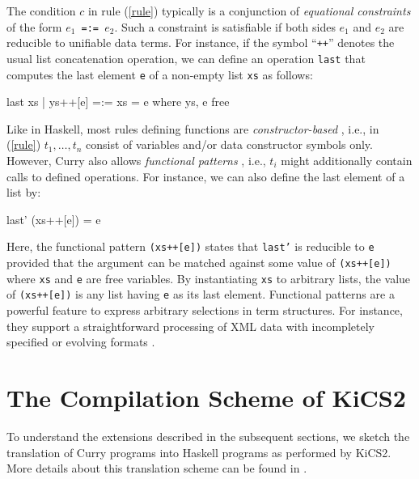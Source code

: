 \documentclass{llncs}
\newcommand{\code}[1]{\mbox{\small\texttt{#1}}}
\begin{document}
The condition $c$ in rule (\ref{rule}) typically is a
conjunction of \emph{equational constraints}
of the form \code{$e_1$\,=:=\,$e_2$}.
Such a constraint is satisfiable if
both sides $e_1$ and $e_2$ are reducible to unifiable data terms.
For instance, if the symbol ``\code{++}'' denotes the usual list
concatenation operation, we can define an operation \code{last}
that computes the last element \code{e} of a non-empty list \code{xs}
as follows:
%
\label{ex:last}
\begin{curry}
  last xs | ys++[e] =:= xs  = e   where ys, e free
\end{curry}
%
Like in Haskell, most rules defining functions are \emph{constructor-based} 
\cite{ODonnell85}, i.e., in (\ref{rule})
$t_1,\ldots,t_n$ consist of variables and/or data constructor symbols
only.  However, Curry also allows \emph{functional patterns}
\cite{AntoyHanus05LOPSTR}, i.e., $t_i$ might additionally contain calls to
defined operations. For instance, we can also define the last element
of a list by:
%
\begin{curry}
  last' (xs++[e]) = e
\end{curry}
%
Here, the functional pattern \code{(xs++[e])}
states that \code{last'} is reducible
to \code{e} provided that the argument can be matched against
some value of \code{(xs++[e])} where \code{xs} and \code{e} are
free variables.
By instantiating \code{xs} to arbitrary lists, the value
of \code{(xs++[e])} is any list having \code{e} as its last element.
Functional patterns are a powerful feature to express arbitrary 
selections in term structures.
For instance, they support a straightforward
processing of XML data with incompletely specified
or evolving formats \cite{Hanus11ICLP}.




\section{The Compilation Scheme of KiCS2}
\label{sec:Compilation}

To understand the extensions described in the subsequent sections,
we sketch the translation of Curry programs
into Haskell programs as performed by KiCS2.
More details about this translation scheme can be found in
\cite{BrasselFischer08IFL,BrasselHanusPeemoellerReck11}.
\end{document}
